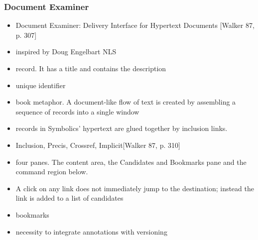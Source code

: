 \begin{frame}
\frametitle{Document Examiner}
\begin{itemize}
	\item Document Examiner: Delivery Interface for Hypertext Documents [Walker 87, p. 307]
	\item inspired by Doug Engelbart NLS
	\item record. It has a title and contains the description
	\item unique identifier
	\item book metaphor. A document-like flow of text is created by assembling a sequence of records into a single window
	\item records in Symbolics’ hypertext are glued together by inclusion links. 
	
	\item Inclusion, Precis, Crossref, Implicit[Walker 87, p. 310]
	\item four panes. The content area, the Candidates and Bookmarks pane and the command region below.
	\item A click on any link does not immediately jump to the destination; instead the link is added to a list of candidates
	\item bookmarks 
	\item necessity to integrate annotations with versioning
\end{itemize}

\end{frame}